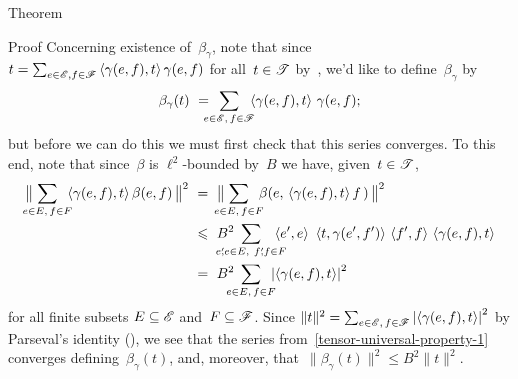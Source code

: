 \documentclass[a]{subfiles}
\begin{document}
\begin{parsec}
\begin{point}{Theorem}
\begin{point}{Proof}
Concerning existence of~$\beta_\gamma$,
note that
since $t=\sum_{e\in\mathscr{E},f\in\mathscr{F}} \left<\gamma(e,f),t\right>\gamma(e,f)$
for all~$t\in\mathscr{T}$
by~,
 we'd like to define~$\beta_\gamma$ by
\begin{equation}
	\label{tensor-universal-property-1}
	\beta_\gamma(t) \ =\  
	\hspace{-1em}
	\sum_{e\in\mathscr{E},\,f\in\mathscr{F}}
	\hspace{-.5em}
	\left<\gamma(e,f),t\right>\,\gamma(e,f);
\end{equation}
but before we can do this
we must first check that this series converges.
To this end,
note that since~$\beta$ is $\ell^2$-bounded by~$B$
we have, given~$t\in \mathscr{T}$,
\begin{alignat*}{3}
	\bigl\|\hspace{-.75em}\sum_{e\in E,\,f\in F}
	\hspace{-.5em}
\left< \gamma(e,f),t\right>\beta(e,f)
\,\bigr\|^2
\ &=\  
\bigl\|\hspace{-.75em}
\sum_{e\in E,\,f\in F}
\hspace{-.5em}
\beta(e,\,\left<\gamma(e,f),t\right>f\,)
\,\bigr\|^2
\\
\ &\leq \  
B^2\hspace{-1.5em}\sum_{e'\!\!,e\in E,\ f'\!\!,f\in F}
\hspace{-1em}
\left<e',e\right>\,
\,\left<t,\gamma(e',f')\right>\,
\left<f',f\right>\,\left<\gamma(e,f),t\right>
\\
\ &=\ 
B^2\hspace{-.75em}\sum_{e\in E,\,f\in F}
\hspace{-.5em}
\left|\left<\gamma(e,f),t\right>\right|^2
\end{alignat*}
for all finite subsets $E\subseteq\mathscr{E}$
and~$F\subseteq \mathscr{F}$.
Since $\|t\|^2=\sum_{e\in \mathscr{E},\,f\in\mathscr{F}}
\left|\left<\gamma(e,f),t\right>\right|^2$
by Parseval's identity (),
we see
that the series
from~\eqref{tensor-universal-property-1}
converges defining~$\beta_\gamma(t)$,
and, moreover,
that~$\|\beta_\gamma(t)\|^2\leq B^2\|t\|^2$.


\end{point}
\end{point}
\end{parsec}
\end{document}
